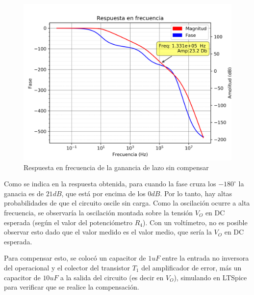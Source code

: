 \begin{figure}[!ht]
\begin{centering}
\includegraphics[scale=0.58]{Imagenes/Fuente_SinComp.png}
\par\end{centering}
\caption{Respuesta en frecuencia de la ganancia de lazo sin compensar}

\end{figure}

Como se indica en la respuesta obtenida, para cuando la fase cruza los $-180^{\circ}$ la ganacia es de $21dB$, que est\'a por encima de los $0dB$. Por lo tanto, hay altas probabilidades de que el circuito oscile sin carga. Como la oscilaci\'on ocurre a alta frecuencia, se observar\'ia la oscilaci\'on montada sobre la tensi\'on $V_O$ en DC esperada (seg\'un el valor del potenci\'ometro $R_4$). Con un volt\'imetro, no es posible observar esto dado que el valor medido es el valor medio, que ser\'ia la $V_O$ en DC esperada.

Para compensar esto, se coloc\'o un capacitor de $1uF$ entre la entrada no inversora del operacional y el colector del transistor $T_1$ del amplificador de error, m\'as un capacitor de $10uF$ a la salida del circuito (es decir en $V_O$), simulando en LTSpice para verificar que se realice la compensaci\'on.

